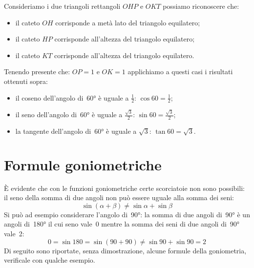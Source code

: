  \begin{minipage}{.45\textwidth}
  \begin{center}
\begin{inaccessibleblock}
    
\end{inaccessibleblock}
  \end{center}
 \end{minipage}
 \begin{minipage}{.45\textwidth}
Consideriamo i due triangoli rettangoli \(OHP\) e \(OKT\) possiamo riconoscere 
che:
\begin{itemize} [noitemsep]
 \item il cateto \(OH\) corrisponde a metà lato del triangolo equilatero; 
 \item il cateto \(HP\) corrisponde all'altezza del triangolo equilatero;
 \item il cateto \(KT\) corrisponde all'altezza del triangolo equilatero.\\
\end{itemize}
 \end{minipage}


Tenendo presente che: \(OP=1\) e \(OK=1\) applichiamo a questi casi i risultati 
ottenuti sopra:
\begin{itemize} [noitemsep]
 \item il coseno dell'angolo di~60° è uguale a \(\frac{1}{2}\): 
  \(\cos 60 = \frac{1}{2}\); 
 \item il seno dell'angolo di~60° è uguale a \(\frac{\sqrt{3}}{2}\): 
  \(\sin 60 = \frac{\sqrt{3}}{2}\); 
 \item la tangente dell'angolo di~60° è uguale a \(\sqrt{3}\): 
  \(\tan 60 = \sqrt{3}\).
\end{itemize}


\section{Formule goniometriche}
\label{sec:gonio_formule}

È evidente che con le funzioni goniometriche certe scorciatoie non sono 
possibili: il seno della somma di due angoli non può essere uguale alla 
somma dei seni:
\vspace{-6pt}
\[\sin \left( \alpha + \beta \right) \ne \sin \alpha + \sin \beta\]
Si può ad esempio considerare l'angolo di~90°: la somma di due angoli di~90° 
è un angoli di~180° il cui seno vale~0 mentre la somma dei seni di  due 
angoli 
di~90° vale~2:
\vspace{-6pt}
\[0 = \sin 180 = \sin \left( 90 + 90 \right) \ne \sin 90 + \sin 90 = 2 \]
Di seguito sono riportate, senza dimostrazione, alcune formule della 
goniometria, verificale con qualche esempio.
\vspace{-6pt}

